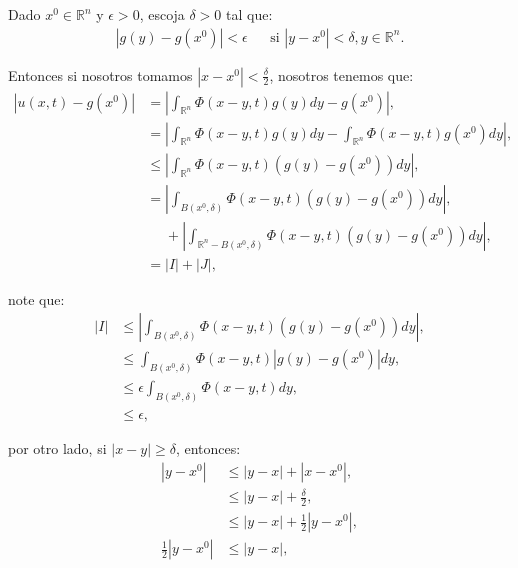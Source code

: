 \documentclass{beamer}
\begin{document}
\begin{frame}
  \begin{block}{}
    Dado $x^0\in \mathbb{R}^{n}$ y $\epsilon>0$, escoja $\delta>0$ tal que:
    \begin{align*}
      |g(y)-g(x^0)|<\epsilon &&\text{si }|y-x^0|<\delta,y\in\mathbb{R}^{n}.
    \end{align*}
  \end{block}
\end{frame}

\begin{frame}
  \begin{block}{}
    Entonces si nosotros tomamos $|x-x^0|<\frac{\delta}{2}$, nosotros tenemos que:
    \begin{align*}
      |u(x,t)-g(x^0)|&=\left|\int_{\mathbb{R}^{n}}\Phi(x-y,t)g(y)dy-g(x^0)\right|,\\
      &=\left|\int_{\mathbb{R}^{n}}\Phi(x-y,t)g(y)dy-\int_{\mathbb{R}^{n}}\Phi(x-y,t)g(x^0)dy\right|,\\
      &\leq \left| \int_{\mathbb{R}^{n}}\Phi(x-y,t)(g(y)-g(x^0))dy \right|,\\
      &=\left| \int_{B(x^{0},\delta)}\Phi(x-y,t)(g(y)-g(x^0))dy \right|,\\
      &\phantom{=}+\left| \int_{\mathbb{R}^{n}-B(x^{0},\delta)}\Phi(x-y,t)(g(y)-g(x^0))dy \right|,\\
      &=|I|+|J|,
    \end{align*}
  \end{block}
\end{frame}

\begin{frame}
  \begin{block}{}
    note que:
    \begin{align*}
      |I|&\leq\left| \int_{B(x^{0},\delta)}\Phi(x-y,t)(g(y)-g(x^0))dy \right|,\\
      &\leq \int_{B(x^{0},\delta)}\Phi(x-y,t)|g(y)-g(x^0)|dy,\\
      &\leq \epsilon \int_{B(x^{0},\delta)}\Phi(x-y,t)dy,\\
      &\leq \epsilon,
    \end{align*}
  \end{block}
\end{frame}

\begin{frame}
  \begin{block}{}
    por otro lado, si $|x-y|\geq \delta$, entonces:
    \begin{align*}
      |y-x^0|&\leq|y-x|+|x-x^0|,\\
      &\leq |y-x|+\frac{\delta}{2},\\
      &\leq |y-x|+\frac{1}{2}|y-x^0|,\\
      \frac{1}{2}|y-x^0|&\leq|y-x|,
    \end{align*}
  \end{block}
\end{frame}
\end{document}
